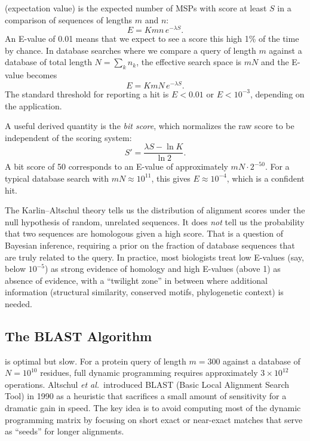  (expectation value) is the expected number of MSPs with score at least $S$ in a comparison of sequences of lengths $m$ and $n$:
\begin{equation}
  \label{eq:evalue}
  E = K m n \, e^{-\lambda S}.
\end{equation}
An E-value of 0.01 means that we expect to see a score this high 1\% of the time by chance. In database searches where we compare a query of length $m$ against a database of total length $N = \sum_k n_k$, the effective search space is $mN$ and the E-value becomes
\begin{equation}
  \label{eq:evalue-database}
  E = K m N \, e^{-\lambda S}.
\end{equation}
The standard threshold for reporting a hit is $E < 0.01$ or $E < 10^{-3}$, depending on the application.

A useful derived quantity is the \emph{bit score}, which normalizes the raw score to be independent of the scoring system:
\begin{equation}
  \label{eq:bitscore}
  S' = \frac{\lambda S - \ln K}{\ln 2}.
\end{equation}
A bit score of 50 corresponds to an E-value of approximately $mN \cdot 2^{-50}$. For a typical database search with $mN \approx 10^{11}$, this gives $E \approx 10^{-4}$, which is a confident hit.

The Karlin--Altschul theory tells us the distribution of alignment scores under the null hypothesis of random, unrelated sequences. It does \emph{not} tell us the probability that two sequences are homologous given a high score. That is a question of Bayesian inference, requiring a prior on the fraction of database sequences that are truly related to the query. In practice, most biologists treat low E-values (say, below $10^{-5}$) as strong evidence of homology and high E-values (above 1) as absence of evidence, with a ``twilight zone'' in between where additional information (structural similarity, conserved motifs, phylogenetic context) is needed.


\subsection{The BLAST Algorithm}
\label{sec:blast}

 is optimal but slow. For a protein query of length $m = 300$ against a database of $N = 10^{10}$ residues, full dynamic programming requires approximately $3 \times 10^{12}$ operations. Altschul \textit{et al.}\ introduced BLAST (Basic Local Alignment Search Tool) in 1990 \cite{altschul1990} as a heuristic that sacrifices a small amount of sensitivity for a dramatic gain in speed. The key idea is to avoid computing most of the dynamic programming matrix by focusing on short exact or near-exact matches that serve as ``seeds'' for longer alignments.

